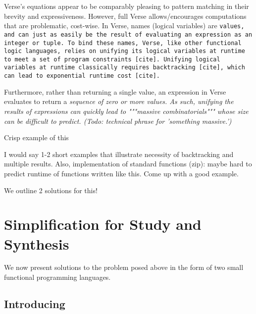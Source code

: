 \documentclass[manuscript,screen,review, 12pt]{acmart}
\begin{document}
\begin{outline}[enumerate]
    Verse's equations appear to be comparably pleasing to pattern matching
    in their brevity and expressiveness. However, full Verse allows/encourages
    computations that are problematic, cost-wise. In Verse, names (logical
    variables) are \tt{values}, and can just as easily be the result of
    evaluating an expression as an integer or tuple. To bind these names, Verse,
    like other functional logic languages, relies on unifying its logical
    variables at runtime to meet a set of program constraints [cite]. Unifying
    logical variables at runtime classically requires backtracking [cite], which
    can lead to exponential runtime cost [cite]. 
        
    Furthermore, rather than returning a single value, an expression in Verse
    evaluates to return a \it{sequence} of zero or more values. As such,
    unifying the results of expressions can quickly lead to """massive
    combinatorials""" whose size can be difficult to predict. (Todo: technical phrase for 'something massive.') 


    \2 Crisp example of this 

    \3 I would say 1-2 short examples that illustrate necessity of backtracking  and multiple results. Also, implementation of standard functions (zip):  maybe hard to predict runtime of functions written like this. Come up with a good example. 

    \3 We outline 2 solutions for this! 

    \end{outline}
\section{Simplification for Study and Synthesis}

We now present solutions to the problem posed above in the form of two small
functional programming languages. %

\subsection{Introducing \PPlus\ }
\end{document}
